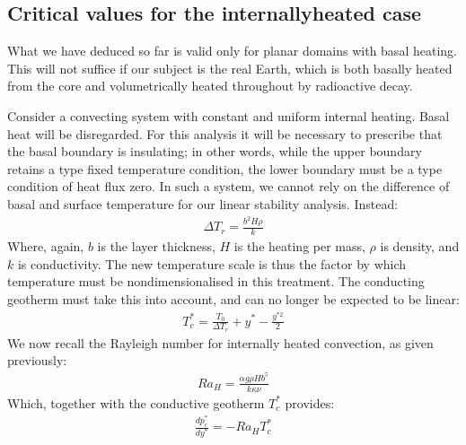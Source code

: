 \documentclass[letterpaper,10pt,english]{jupyterBook}
\begin{document}
\subsection{Critical values for the internally\sphinxhyphen{}heated case}
\label{\detokenize{content/chapter_02_methods/section1:critical-values-for-the-internally-heated-case}}
\sphinxAtStartPar
What we have deduced so far is valid only for planar domains with basal heating. This will not suffice if our subject is the real Earth, which is both basally heated from the core and volumetrically heated throughout by radioactive decay.

\sphinxAtStartPar
Consider a convecting system with constant and uniform internal heating. Basal heat will be disregarded. For this analysis it will be necessary to prescribe that the basal boundary is insulating; in other words, while the upper boundary retains a \sphinxhyphen{}type fixed temperature condition, the lower boundary must be a \sphinxhyphen{}type condition of heat flux zero. In such a system, we cannot rely on the difference of basal and surface temperature for our linear stability analysis. Instead:
\begin{equation*}
\begin{split} \Delta T_r = \frac{b^2 H \rho}{k} \end{split}
\end{equation*}
\sphinxAtStartPar
Where, again, \(b\) is the layer thickness, \(H\) is the heating per mass, \(\rho\) is density, and \(k\) is conductivity. The new temperature scale is thus the factor by which temperature must be non\sphinxhyphen{}dimensionalised in this treatment. The conducting geotherm must take this into account, and can no longer be expected to be linear:
\begin{equation*}
\begin{split} T_c^* = \frac{T_0}{\Delta T_r} + y^* - \frac{y^{*2}}{2} \end{split}
\end{equation*}
\sphinxAtStartPar
We now recall the Rayleigh number for internally heated convection, as given previously:
\begin{equation*}
\begin{split} Ra_H = \frac{\alpha g \rho H b^5}{k \kappa \nu} \end{split}
\end{equation*}
\sphinxAtStartPar
Which, together with the conductive geotherm \(T_c^*\) provides:
\begin{equation*}
\begin{split} \frac{d p_c^*}{d y^*} = -Ra_H T_c^* \end{split}
\end{equation*}
\end{document}
